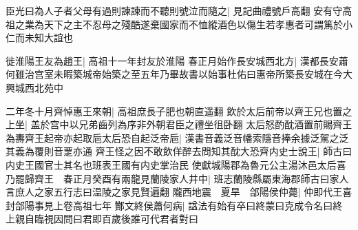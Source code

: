 臣光曰為人子者父母有過則諫諫而不聽則號泣而隨之|{
	見記曲禮號戶高翻}
安有守高祖之業為天下之主不忍母之殘酷遂棄國家而不恤縱酒色以傷生若孝惠者可謂篤於小仁而未知大誼也

徙淮陽王友為趙王|{
	高祖十一年封友於淮陽}
春正月始作長安城西北方|{
	漢都長安蕭何雖治宫室未暇築城帝始築之至五年乃畢故書以始事杜佑曰惠帝所築長安城在今大興城西北苑中}


二年冬十月齊悼惠王來朝|{
	高祖庶長子肥也朝直遥翻}
飲於太后前帝以齊王兄也置之上坐|{
	盖於宫中以兄弟齒列為序非外朝君臣之禮坐徂卧翻}
太后怒酌酖酒置前賜齊王為夀齊王起帝亦起取巵太后恐自起泛帝巵|{
	漢書音義泛音幡索隱音捧余據泛駕之泛其義為覆則音覂亦通}
齊王怪之因不敢飲佯醉去問知其酖大恐齊内史士說王|{
	師古曰内史王國官士其名也班表王國有内史掌治民}
使獻城陽郡為魯元公主湯沐邑太后喜乃罷歸齊王　春正月癸酉有兩龍見蘭陵家人井中|{
	班志蘭陵縣屬東海郡師古曰家人言庶人之家五行志曰温陵之家見賢遍翻}
隴西地震　夏旱　郃陽侯仲薨|{
	仲即代王喜封郃陽事見上卷高祖七年}
酇文終侯蕭何病|{
	諡法有始有卒曰終蒙曰克成令名曰終}
上親自臨視因問曰君即百歲後誰可代君者對曰

